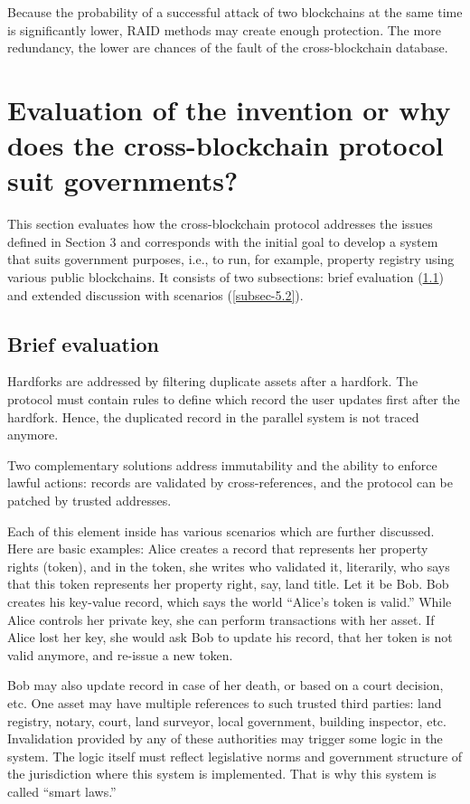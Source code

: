 \begin{multicols}{2}
Because the probability of a successful attack of two blockchains at the same time is significantly lower, RAID methods may create enough protection. The more redundancy, the lower are chances of the fault of the cross-blockchain database.

\section{Evaluation of the invention or why does the cross-blockchain protocol suit governments?}\label{sec-5}

This section evaluates how the cross-blockchain protocol addresses the issues defined in Section 3 and corresponds with the initial goal to develop a system that suits government purposes, i.e., to run, for example, property registry using various public blockchains. It consists of two subsections: brief evaluation (\ref{subsec-5.1}) and extended discussion with scenarios (\ref{subsec-5.2}).

\subsection{Brief evaluation}\label{subsec-5.1}

Hardforks are addressed by filtering duplicate assets after a hardfork. The protocol must contain rules to define which record the user updates first after the hardfork. Hence, the duplicated record in the parallel system is not traced anymore.
 
Two complementary solutions address immutability and the ability to enforce lawful actions: records are validated by cross-references, and the protocol can be patched by trusted addresses.

Each of this element inside has various scenarios which are further discussed. Here are basic examples: Alice creates a record that represents her property rights (token), and in the token, she writes who validated it, literarily, who says that this token represents her property right, say, land title. Let it be Bob. Bob creates his key-value record, which says the world “Alice’s token is valid.” While Alice controls her private key, she can perform transactions with her asset. If Alice lost her key, she would ask Bob to update his record, that her token is not valid anymore, and re-issue a new token. 

Bob may also update record in case of her death, or based on a court decision, etc. One asset may have multiple references to such trusted third parties: land registry, notary, court, land surveyor, local government, building inspector, etc. Invalidation provided by any of these authorities may trigger some logic in the system. The logic itself must reflect legislative norms and government structure of the jurisdiction where this system is implemented. That is why this system is called “smart laws.”


\end{multicols}
